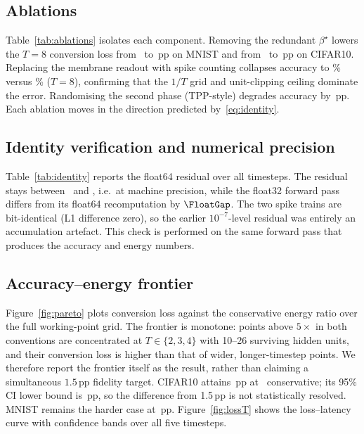 \subsection{Ablations}
\label{ssec:ablations}

Table~\ref{tab:ablations} isolates each component. Removing the redundant $\beta^\star$ lowers the $T{=}8$ conversion loss from \BetaLossVoneM\ to \BetaLossVtwoM\,pp on MNIST and from \BetaLossVoneC\ to \BetaLossVtwoC\,pp on CIFAR10. Replacing the membrane readout with spike counting collapses accuracy to \CountAcc\% versus \MembraneAcc\% ($T{=}8$), confirming that the $1/T$ grid and unit-clipping ceiling dominate the error. Randomising the second phase (TPP-style) degrades accuracy by \TPPGain\,pp. Each ablation moves in the direction predicted by~\eqref{eq:identity}.

\begin{table}[t]
\centering
\caption{Component ablations at $T{=}8$ (five seeds). Values are top-1 (\%) or conversion loss (pp).}
\label{tab:ablations}

\end{table}

\subsection{Identity verification and numerical precision}
\label{ssec:verify}

Table~\ref{tab:identity} reports the float64 residual over all timesteps. The residual stays between \IdentityMin\ and \IdentityMax, i.e.\ at machine precision, while the float32 forward pass differs from its float64 recomputation by $\FloatGap$. The two spike trains are bit-identical (L1 difference zero), so the earlier $10^{-7}$-level residual was entirely an accumulation artefact. This check is performed on the same forward pass that produces the accuracy and energy numbers.

\begin{table}[t]
\centering
\caption{Maximum $|(\Bh-B)-R A(E_1W_2)|$ in float64 across timesteps and holdout seeds.}
\label{tab:identity}

\end{table}

\subsection{Accuracy--energy frontier}
\label{ssec:frontier}

Figure~\ref{fig:pareto} plots conversion loss against the conservative energy ratio over the full working-point grid. The frontier is monotone: points above $5\times$ in both conventions are concentrated at $T\in\{2,3,4\}$ with 10--26 surviving hidden units, and their conversion loss is higher than that of wider, longer-timestep points. We therefore report the frontier itself as the result, rather than claiming a simultaneous $1.5$\,pp fidelity target. CIFAR10 attains \CIFARLoss\,pp at \CIFAREc\texttimes\ conservative; its 95\% CI lower bound is \CIFARLower\,pp, so the difference from 1.5\,pp is not statistically resolved. MNIST remains the harder case at \MNISTLoss\,pp. Figure~\ref{fig:lossT} shows the loss--latency curve with confidence bands over all five timesteps.
